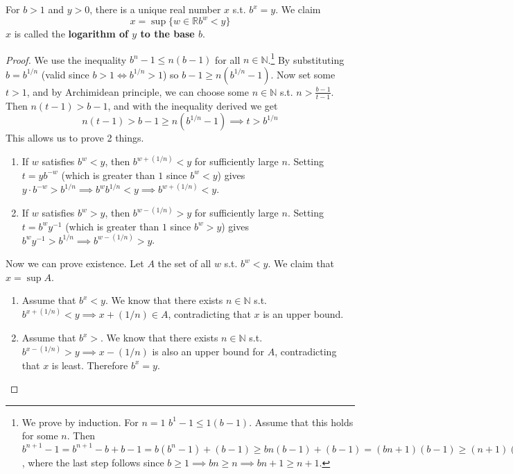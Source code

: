   \begin{theorem}[Logarithm]
    For $b > 1$ and $y > 0$, there is a unique real number $x$ s.t. $b^x = y$. We claim 
    \begin{equation}
      x = \sup\{ w \in \mathbb{R} b^w < y \}
    \end{equation}
    $x$ is called the \textbf{logarithm of $y$ to the base $b$}. 
  \end{theorem}
  \begin{proof}
    We use the inequality $b^n - 1 \leq n (b-1)$ for all $n \in \mathbb{N}$.\footnote{We prove by induction. For $n=1$ $b^1 - 1 \leq 1 (b-1)$. Assume that this holds for some $n$. Then $b^{n+1} - 1 = b^{n+1} - b + b - 1 = b (b^n - 1) + (b-1) \geq bn (b-1) + (b-1) = (bn + 1) (b-1) \geq (n+1) (b-1)$, where the last step follows since $b \geq 1 \implies bn \geq n \implies bn + 1 \geq n + 1$. } By substituting $b = b^{1/n}$ (valid since $b > 1 \iff b^{1/n} > 1$) so $b-1 \geq n(b^{1/n} - 1)$. Now set some $t > 1$, and by Archimidean principle, we can choose some $n \in \mathbb{N}$ s.t. $n > \frac{b-1}{t-1}$. Then $n (t-1) > b-1$, and with the inequality derived we get 
    \begin{equation}
      n (t - 1) > b - 1 \geq n (b^{1/n} - 1) \implies t > b^{1/n}
    \end{equation} 
    This allows us to prove 2 things. 
    \begin{enumerate}
      \item If $w$ satisfies $b^w < y$, then $b^{w + (1/n)} < y$ for sufficiently large $n$. Setting $t = y b^{-w}$ (which is greater than $1$ since $b^w < y$) gives $y \cdot b^{-w} > b^{1/n} \implies b^w b^{1/n} < y \implies b^{w + (1/n)} < y$. 
      \item If $w$ satisfies $b^w > y$, then $b^{w - (1/n)} > y$ for sufficiently large $n$. Setting $t = b^w y^{-1}$ (which is greater than $1$ since $b^w > y$) gives $b^w y^{-1} > b^{1/n} \implies b^{w - (1/n)} > y$. 
    \end{enumerate}
    Now we can prove existence. Let $A$ the set of all $w$ s.t. $b^w < y$. We claim that $x = \sup{A}$. 
    \begin{enumerate}
      \item Assume that $b^x < y$. We know that there exists $n \in \mathbb{N}$ s.t. $b^{x + (1/n)} < y \implies x + (1/n) \in A$, contradicting that $x$ is an upper bound. 
      \item Assume that $b^x > $. We know that there exists $n \in \mathbb{N}$ s.t. $b^{x - (1/n)} > y \implies x - (1/n)$ is also an upper bound for $A$, contradicting that $x$ is least. Therefore $b^x = y$. 

\end{enumerate}
\end{proof}
